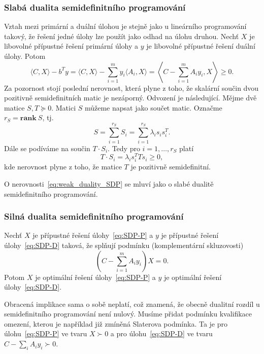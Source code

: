 \subsubsection*{Slabá dualita semidefinitního programování}

Vztah mezi primární a duální úlohou je stejně jako u lineárního programování takový, že řešení jedné úlohy lze použít jako odhad na úlohu druhou. Nechť $X$ je libovolné přípustné řešení primární úlohy a $y$ je libovolné přípustné řešení duální úlohy. Potom
\begin{equation}
    \langle C, X \rangle - b^T y =
    \langle C, X \rangle - \sum_{i=1}^m y_i \langle A_i, X \rangle =
    \left\langle C - \sum_{i=1}^m A_i y_i, X \right\rangle \geq 0.
    \label{eq:weak_duality_SDP}
\end{equation}
Za pozornost stojí poslední nerovnost, která plyne z toho, že skalární součin dvou pozitivně semidefinitních matic je nezáporný. Odvození je následující. Mějme dvě matice $S, T \succeq 0$. Matici $S$ můžeme napsat jako součet  matic. Označme $r_S = \textbf{rank}\ S$, tj.
$$
    S = \sum_{i=1}^{r_S} S_i = \sum_{i=1}^{r_S} \lambda_i s_i s_i^T.
$$
Dále se podíváme na součin $T \cdot S_i$. Tedy pro $i = 1, \dots, r_S$ platí
$$
    T \cdot S_i = \lambda_i s_i^T T s_i \geq 0,
$$
kde nerovnost plyne z toho, že matice $T$ je pozitivně semidefinitní.

O nerovnosti~\ref{eq:weak_duality_SDP} se mluví jako o slabé dualitě semidefinitního programování.

\subsubsection*{Silná dualita semidefinitního programování}

\begin{vt2}
    Nechť $X$ je přípustné řešení úlohy~\ref{eq:SDP-P} a $y$ je přípustné řešení úlohy~\ref{eq:SDP-D} taková, že splňují podmínku (komplementární skluzovosti)
    $$
        \left( C - \sum_{i=1}^m A_i y_i \right) X = 0.
    $$
    Potom $X$ je optimální řešení úlohy~\ref{eq:SDP-P} a $y$ je optimální řešení úlohy~\ref{eq:SDP-D}.
\end{vt2}

Obracená implikace sama o sobě neplatí, což znamená, že obecně dualitní rozdíl u semidefinitního programování není nulový. Musíme přidat podmínku kvalifikace omezení, kterou je například již zmíněná Slaterova podmínka. Ta je pro úlohu~\ref{eq:SDP-P} ve tvaru $X \succ 0$ a pro úlohu~\ref{eq:SDP-D} ve tvaru $C - \sum_i A_i y_i \succ 0$.

